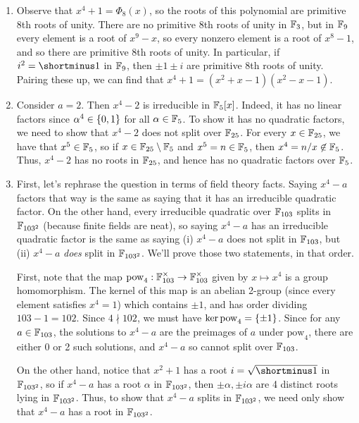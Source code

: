 \begin{solution}
\begin{enumerate}
    \item Observe that $x^4+1 = \Phi_8(x)$, so the roots of this polynomial are primitive 8th roots of unity. There are no primitive 8th roots of unity in $\mathbb{F}_3$, but in $\mathbb{F}_9$ every element is a root of $x^9-x$, so every nonzero element is a root of $x^8-1$, and so there are primitive 8th roots of unity. In particular, if $i^2 = \shortminus 1$ in $\mathbb{F}_9$, then $\pm 1 \pm i$ are primitive 8th roots of unity. Pairing these up, we can find that $x^4+1 = (x^2+x-1)(x^2-x-1)$.
    \item Consider $a=2$. Then $x^4-2$ is irreducible in $\mathbb{F}_5[x]$. Indeed, it has no linear factors since $\alpha^4\in\{0,1\}$ for all $\alpha \in \mathbb{F}_5$. To show it has no quadratic factors, we need to show that $x^4-2$ does not split over $\mathbb{F}_{25}$. For every $x \in \mathbb{F}_{25}$, we have that $x^5 \in \mathbb{F}_5$, so if $x \in \mathbb{F}_{25} \setminus \mathbb{F}_5$ and $x^5 = n \in \mathbb{F}_5$, then $x^4 = n/x \not\in \mathbb{F}_5$. Thus, $x^4-2$ has no roots in $\mathbb{F}_{25}$, and hence has no quadratic factors over $\mathbb{F}_5$.
    \item First, let's rephrase the question in terms of field theory facts. Saying $x^4-a$ factors that way is the same as saying that it has an irreducible quadratic factor. On the other hand, every irreducible quadratic over $\mathbb{F}_{103}$ splits in $\mathbb{F}_{103^2}$ (because finite fields are neat), so saying $x^4-a$ has an irreducible quadratic factor is the same as saying (i) $x^4-a$ does not split in $\mathbb{F}_{103}$, but (ii) $x^4-a$ \emph{does} split in $\mathbb{F}_{103^2}$. We'll prove those two statements, in that order.
    
    First, note that the map $\text{pow}_4: \mathbb{F}_{103}^{\times} \to \mathbb{F}_{103}^{\times}$ given by $x \mapsto x^4$ is a group homomorphism. The kernel of this map is an abelian 2-group (since every element satisfies $x^4 = 1$) which contains $\pm 1$, and has order dividing $103 - 1 = 102$. Since $4 \nmid 102$, we must have $\ker \text{pow}_4 = \{\pm 1\}$. Since for any $a \in \mathbb{F}_{103}$, the solutions to $x^4-a$ are the preimages of $a$ under $\text{pow}_4$, there are either 0 or 2 such solutions, and $x^4-a$ so cannot split over $\mathbb{F}_{103}$.

    On the other hand, notice that $x^2+1$ has a root $i = \sqrt{\shortminus 1}$ in $\mathbb{F}_{103^2}$, so if $x^4-a$ has a root $\alpha$ in $\mathbb{F}_{103^2}$, then $\pm \alpha, \pm i \alpha$ are 4 distinct roots lying in $\mathbb{F}_{103^2}$. Thus, to show that $x^4-a$ splits in $\mathbb{F}_{103^2}$, we need only show that $x^4-a$ has a root in $\mathbb{F}_{103^2}$.
    

\end{enumerate}
\end{solution}
